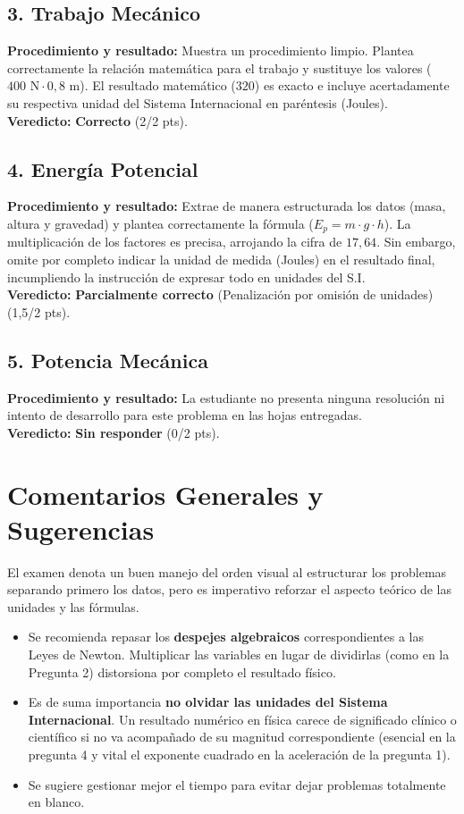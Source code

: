 \documentclass[12pt,letterpaper]{article}
\begin{document}
\subsection*{3. Trabajo Mecánico}
\textbf{Procedimiento y resultado:} Muestra un procedimiento limpio. Plantea correctamente la relación matemática para el trabajo y sustituye los valores ($400 \text{ N} \cdot 0,8 \text{ m}$). El resultado matemático ($320$) es exacto e incluye acertadamente su respectiva unidad del Sistema Internacional en paréntesis (Joules). \\
\textbf{Veredicto:} \textbf{Correcto} (2/2 pts).

\subsection*{4. Energía Potencial}
\textbf{Procedimiento y resultado:} Extrae de manera estructurada los datos (masa, altura y gravedad) y plantea correctamente la fórmula ($E_p = m \cdot g \cdot h$). La multiplicación de los factores es precisa, arrojando la cifra de $17,64$. Sin embargo, omite por completo indicar la unidad de medida (Joules) en el resultado final, incumpliendo la instrucción de expresar todo en unidades del S.I. \\
\textbf{Veredicto:} \textbf{Parcialmente correcto} (Penalización por omisión de unidades) (1,5/2 pts).

\subsection*{5. Potencia Mecánica}
\textbf{Procedimiento y resultado:} La estudiante no presenta ninguna resolución ni intento de desarrollo para este problema en las hojas entregadas. \\
\textbf{Veredicto:} \textbf{Sin responder} (0/2 pts).

\vspace{0.5cm}
\section*{Comentarios Generales y Sugerencias}
El examen denota un buen manejo del orden visual al estructurar los problemas separando primero los datos, pero es imperativo reforzar el aspecto teórico de las unidades y las fórmulas.
\begin{itemize}
    \item Se recomienda repasar los \textbf{despejes algebraicos} correspondientes a las Leyes de Newton. Multiplicar las variables en lugar de dividirlas (como en la Pregunta 2) distorsiona por completo el resultado físico.
    \item Es de suma importancia \textbf{no olvidar las unidades del Sistema Internacional}. Un resultado numérico en física carece de significado clínico o científico si no va acompañado de su magnitud correspondiente (esencial en la pregunta 4 y vital el exponente cuadrado en la aceleración de la pregunta 1).
    \item Se sugiere gestionar mejor el tiempo para evitar dejar problemas totalmente en blanco.
\end{itemize}
\end{document}

